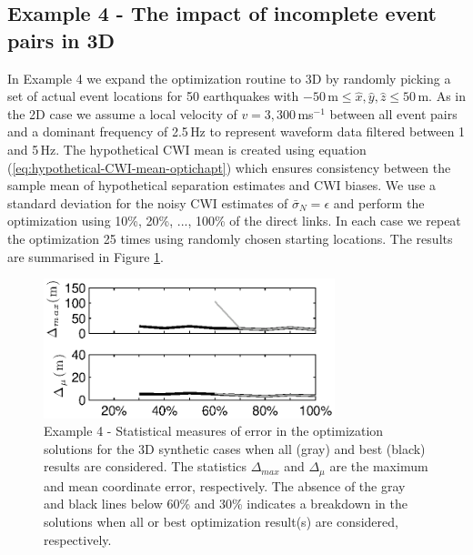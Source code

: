 \documentclass[extra, onecolumn, doublespacing]{gji}
\begin{document}
\subsection{Example 4 - The impact of incomplete event pairs in 3D}

In Example 4 we expand the optimization routine to 3D by randomly
picking
 a set of actual event locations for 50 earthquakes with
$-50$\,m$\leq \hat{x},\hat{y},\hat{z} \leq 50$\,m. As in the 2D case
we assume a local velocity of $v=3,300\,$ms$^{-1}$ between all event
pairs and a dominant frequency of 2.5$\,$Hz to represent
 waveform data filtered between 1 and 5$\,$Hz.
The hypothetical CWI mean is created using equation
(\ref{eq:hypothetical-CWI-mean-optichapt}) which ensures consistency
between the sample mean of hypothetical separation estimates and CWI
biases. We use a standard deviation for the noisy CWI estimates of
$\bar{\sigma}_N = \epsilon$ and perform the optimization
using 10\%, 20\%, ..., 100\% of the direct links. In each case we
repeat the optimization 25 times using randomly chosen starting
locations. The results are summarised in Figure
\ref{fig:optimisationresults-3Dsynth}.

\begin{figure}
\noindent\includegraphics[width =
20pc]{diags/synth3Dmulti/ressummary_3Dsynth50eq.eps}
\caption{Example 4 - Statistical measures of error in the
optimization solutions for the 3D synthetic cases when all (gray)
and best (black) results are considered. The statistics
$\Delta_{max}$ and $\Delta_\mu$ are the maximum and mean coordinate
error, respectively. The absence of the gray and black lines below
60\% and 30\% indicates a breakdown in the solutions when all or
best optimization result(s) are considered, respectively.}
\label{fig:optimisationresults-3Dsynth}
\end{figure}
\end{document}
